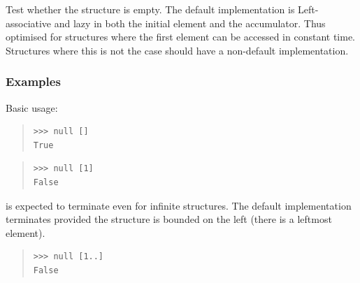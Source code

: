 \begin{haddockdesc}
\item[\begin{tabular}{@{}l}
null :: Foldable t => t a -> Bool
\end{tabular}]
{\haddockbegindoc
Test whether the structure is empty.  The default implementation is
 Left-associative and lazy in both the initial element and the
 accumulator.  Thus optimised for structures where the first element can
 be accessed in constant time.  Structures where this is not the case
 should have a non-default implementation.\par
\subsubsection*{\textbf{Examples}}
Basic usage:\par
\begin{quote}
{\haddockverb\begin{verbatim}
>>> null []
True

\end{verbatim}}
\end{quote}
\begin{quote}
{\haddockverb\begin{verbatim}
>>> null [1]
False

\end{verbatim}}
\end{quote}
 is expected to terminate even for infinite structures.
 The default implementation terminates provided the structure
 is bounded on the left (there is a leftmost element).\par
\begin{quote}
{\haddockverb\begin{verbatim}
>>> null [1..]
False

\end{verbatim}}
\end{quote}}
\end{haddockdesc}
